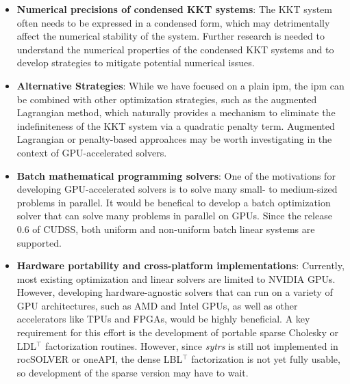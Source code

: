\documentclass{article}
\begin{document}
\begin{itemize}[leftmargin=*,itemsep=0pt,parsep=0pt,partopsep=0pt]
\item \textbf{Numerical precisions of condensed KKT systems}: The KKT system often needs to be expressed in a condensed form, which may detrimentally affect the numerical stability of the system.
Further research is needed to understand the numerical properties of the condensed KKT systems and to develop strategies to mitigate potential numerical issues.
\item \textbf{Alternative Strategies}: While we have focused on a plain \gls*{ipm}, the \gls*{ipm} can be combined with other optimization strategies, such as the augmented Lagrangian method, which naturally provides a mechanism to eliminate the indefiniteness of the KKT system via a quadratic penalty term.
Augmented Lagrangian or penalty-based approahces may be worth investigating in the context of GPU-accelerated solvers.
\item \textbf{Batch mathematical programming solvers}: One of the motivations for developing GPU-accelerated solvers is to solve many small- to medium-sized problems in parallel.
It would be benefical to develop a batch optimization solver that can solve many problems in parallel on GPUs.
Since the release 0.6 of CUDSS, both uniform and non-uniform batch linear systems are supported. 
\item \textbf{Hardware portability and cross-platform implementations}: Currently, most existing optimization and linear solvers are limited to NVIDIA GPUs.
However, developing hardware-agnostic solvers that can run on a variety of GPU architectures, such as AMD and Intel GPUs, as well as other accelerators like TPUs and FPGAs, would be highly beneficial.
A key requirement for this effort is the development of portable sparse Cholesky or LDL$^\top$ factorization routines.
However, since \emph{sytrs} is still not implemented in rocSOLVER or oneAPI, the dense LBL$^\top$ factorization is not yet fully usable, so development of the sparse version may have to wait.
\end{itemize}
\end{document}
